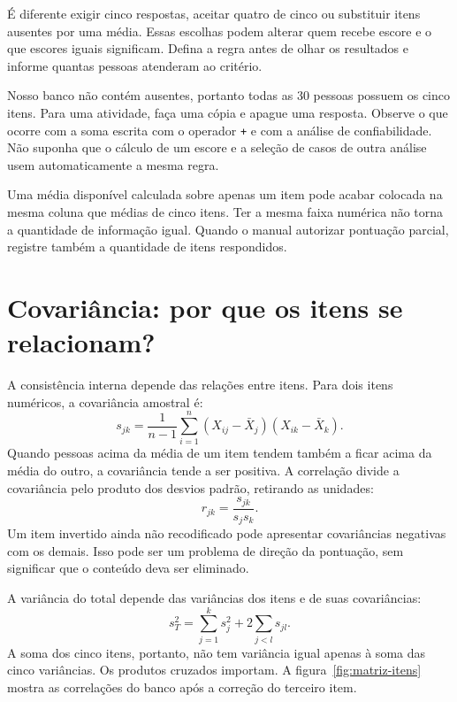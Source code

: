 É diferente exigir cinco respostas, aceitar quatro de cinco ou substituir itens ausentes por uma média. Essas escolhas podem alterar quem recebe escore e o que escores iguais significam. Defina a regra antes de olhar os resultados e informe quantas pessoas atenderam ao critério.

Nosso banco não contém ausentes, portanto todas as 30 pessoas possuem os cinco itens. Para uma atividade, faça uma cópia e apague uma resposta. Observe o que ocorre com a soma escrita com o operador \texttt{+} e com a análise de confiabilidade. Não suponha que o cálculo de um escore e a seleção de casos de outra análise usem automaticamente a mesma regra.

Uma média disponível calculada sobre apenas um item pode acabar colocada na mesma coluna que médias de cinco itens. Ter a mesma faixa numérica não torna a quantidade de informação igual. Quando o manual autorizar pontuação parcial, registre também a quantidade de itens respondidos.

\section{Covariância: por que os itens se relacionam?}

A consistência interna depende das relações entre itens. Para dois itens numéricos, a covariância amostral é:
\[
s_{jk}=\frac{1}{n-1}\sum_{i=1}^{n}
(X_{ij}-\bar{X}_j)(X_{ik}-\bar{X}_k).
\]
Quando pessoas acima da média de um item tendem também a ficar acima da média do outro, a covariância tende a ser positiva. A correlação divide a covariância pelo produto dos desvios padrão, retirando as unidades:
\[
r_{jk}=\frac{s_{jk}}{s_js_k}.
\]
Um item invertido ainda não recodificado pode apresentar covariâncias negativas com os demais. Isso pode ser um problema de direção da pontuação, sem significar que o conteúdo deva ser eliminado.

A variância do total depende das variâncias dos itens e de suas covariâncias:
\[
s_T^2=\sum_{j=1}^{k}s_j^2+2\sum_{j<l}s_{jl}.
\]
A soma dos cinco itens, portanto, não tem variância igual apenas à soma das cinco variâncias. Os produtos cruzados importam. A figura~\ref{fig:matriz-itens} mostra as correlações do banco após a correção do terceiro item.

